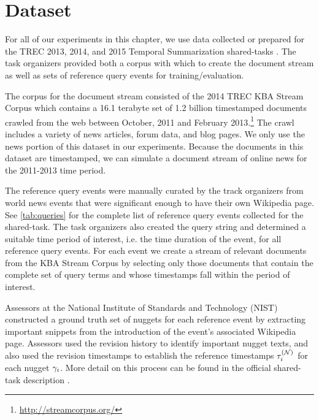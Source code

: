 \section{Dataset}

For all of our experiments in this chapter, we use data collected or prepared
for the TREC 2013, 2014, and 2015 Temporal Summarization shared-tasks
\citep{aslam2013,aslam2014,aslam2015}. The task organizers provided both a
corpus with which to create the document stream as well as sets of reference
query events for training/evaluation. 

The corpus for the document stream consisted of the 2014 TREC KBA Stream Corpus
\citep{frank2012} which contains a 16.1 terabyte set of 1.2 billion timestamped
documents crawled from the web between October, 2011 and February
2013.\footnote{\url{http://streamcorpus.org/}} The crawl includes a variety of
news articles, forum data, and blog pages.  We only use the news portion of
this dataset in our experiments.  Because the documents in this dataset are
timestamped, we can simulate a document stream of online news for the 2011-2013
time period.

The reference query events were manually curated by the track organizers from
world news events that were significant enough to have their own Wikipedia
page. See \autoref{tab:queries} for the complete list of reference query events
collected for the shared-task. The task organizers also created the query
string and determined a suitable time period of interest, i.e. the time
duration of the event, for all reference query events.  For each event we
create a stream of relevant documents from the KBA Stream Corpus by selecting
only those documents that contain the complete set of query terms and whose
timestamps fall within the period of interest. 

Assessors at the National Institute of Standards and Technology (NIST)
constructed a ground truth set of nuggets for each reference event by
extracting important snippets from the introduction of the event's associated
Wikipedia page.  Assessors used the revision history to identify important
nugget texts, and also used the revision timestamps to establish the reference
timestamps $\tau^{(\mathcal{N})}_i$ for each nugget $\gamma_i$.  More detail on this process
can be found in the official shared-task  description \citep{aslam2013}.
